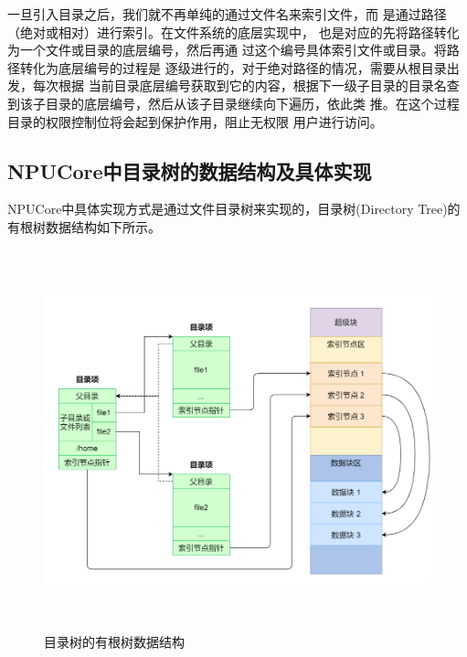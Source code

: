 一旦引入目录之后，我们就不再单纯的通过文件名来索引文件，而
是通过路径（绝对或相对）进行索引。在文件系统的底层实现中，
也是对应的先将路径转化为一个文件或目录的底层编号，然后再通
过这个编号具体索引文件或目录。将路径转化为底层编号的过程是
逐级进行的，对于绝对路径的情况，需要从根目录出发，每次根据
当前目录底层编号获取到它的内容，根据下一级子目录的目录名查
到该子目录的底层编号，然后从该子目录继续向下遍历，依此类
推。在这个过程目录的权限控制位将会起到保护作用，阻止无权限
用户进行访问。

\subsection{NPUCore中目录树的数据结构及具体实现}
NPUCore中具体实现方式是通过文件目录树来实现的，目录树(Directory Tree)的有根树数据结构如下所示。

\begin{figure}[H]
	\centering
	\includegraphics[width=14cm,height=11cm]{figures/07-05-目录树的有根树数据结构.png}
	\caption{目录树的有根树数据结构}
\end{figure} 

